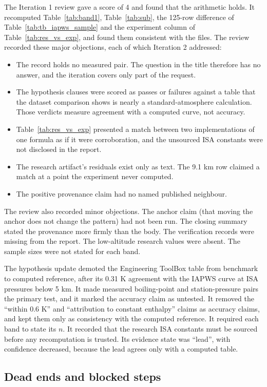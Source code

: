 \documentclass[11pt,letterpaper]{article}
\begin{document}
The Iteration 1 review gave a score of 4 and found that the arithmetic holds. It recomputed Table~\ref{tab:band1}, Table~\ref{tab:sub}, the 125-row difference of Table~\ref{tab:tb_iapws_sample} and the experiment column of Table~\ref{tab:res_vs_exp}, and found them consistent with the files. The review recorded these major objections, each of which Iteration 2 addressed:
\begin{itemize}
\item The record holds no measured pair. The question in the title therefore has no answer, and the iteration covers only part of the request.
\item The hypothesis clauses were scored as passes or failures against a table that the dataset comparison shows is nearly a standard-atmosphere calculation. Those verdicts measure agreement with a computed curve, not accuracy.
\item Table~\ref{tab:res_vs_exp} presented a match between two implementations of one formula as if it were corroboration, and the unsourced ISA constants were not disclosed in the report.
\item The research artifact's residuals exist only as text. The 9.1 km row claimed a match at a point the experiment never computed.
\item The positive provenance claim had no named published neighbour.
\end{itemize}
The review also recorded minor objections. The anchor claim (that moving the anchor does not change the pattern) had not been run. The closing summary stated the provenance more firmly than the body. The verification records were missing from the report. The low-altitude research values were absent. The sample sizes were not stated for each band.

The hypothesis update demoted the Engineering ToolBox table from benchmark to computed reference, after its 0.31 K agreement with the IAPWS curve at ISA pressures below 5 km. It made measured boiling-point and station-pressure pairs the primary test, and it marked the accuracy claim as untested. It removed the ``within 0.6 K'' and ``attribution to constant enthalpy'' claims as accuracy claims, and kept them only as consistency with the computed reference. It required each band to state its $n$. It recorded that the research ISA constants must be sourced before any recomputation is trusted. Its evidence state was ``lead'', with confidence decreased, because the lead agrees only with a computed table.

\subsection{Dead ends and blocked steps}
\end{document}
